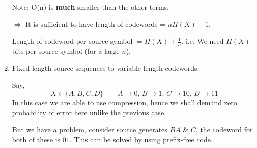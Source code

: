 \documentclass{article}
\begin{document}
\begin{enumerate}
    Note: O(n) is \textbf{much} smaller than the other terms.

    $\Rightarrow$ It is sufficient to have length of codewords = $nH(X)+1$.

    Length of codeword per source symbol $=H(X)+\frac{1}{n}$. i.e. We need $H(X)$ bits per source symbol (for a large $n$).

    \item Fixed length source sequences to variable length codewords.

    Say,
    $$ X \in \{ A,B,C,D\} \qquad A\to 0 ,\, B \to 1,\, C\to 10,\, D \to 11$$
    In this case we are able to use compression, hence we shall demand zero probability of error here unlike the previous case.

    But we have a problem, consider source generates $BA$ \& $C$, the codeword for both of these is $01$. This can be solved by using prefix-free code.
\end{enumerate}
\end{document}
